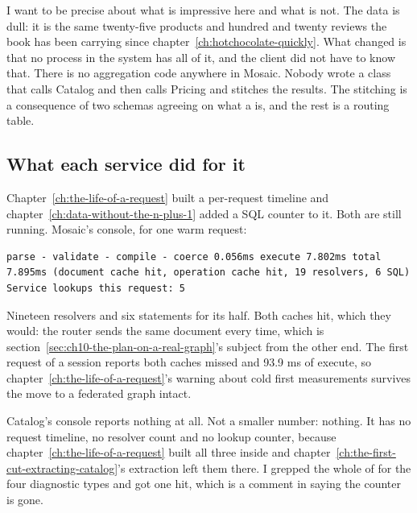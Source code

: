 %
I want to be precise about what is impressive here and what is not. The data is
dull: it is the same twenty-five products and hundred and twenty reviews the
book has been carrying since chapter~\ref{ch:hotchocolate-quickly}. What
changed is that no process in the system has all of it, and the client did not
have to know that. There is no aggregation code anywhere in Mosaic. Nobody
wrote a class that calls Catalog and then calls Pricing and stitches the
results. The stitching is a consequence of two schemas agreeing on what a
 is, and the rest is a routing table.

\subsection*{What each service did for it}

%
Chapter~\ref{ch:the-life-of-a-request} built a per-request timeline and
chapter~\ref{ch:data-without-the-n-plus-1} added a SQL counter to it. Both are
still running. Mosaic's console, for one warm request:

\begin{verbatim}
parse - validate - compile - coerce 0.056ms execute 7.802ms total 7.895ms (document cache hit, operation cache hit, 19 resolvers, 6 SQL)
Service lookups this request: 5
\end{verbatim}

Nineteen resolvers and six statements for its half. Both caches hit, which they
would: the router sends the same document every time, which is
section~\ref{sec:ch10-the-plan-on-a-real-graph}'s subject from the other end.
The first request of a session reports both caches missed and 93.9 ms of
execute, so chapter~\ref{ch:the-life-of-a-request}'s warning about cold first
measurements survives the move to a federated graph intact.

%
Catalog's console reports nothing at all. Not a smaller number: nothing. It has
no request timeline, no resolver count and no lookup counter, because
chapter~\ref{ch:the-life-of-a-request} built all three inside 
and chapter~\ref{ch:the-first-cut-extracting-catalog}'s extraction left them
there. I grepped the whole of  for the four
diagnostic types and got one hit, which is a comment in
 saying the counter is gone.

